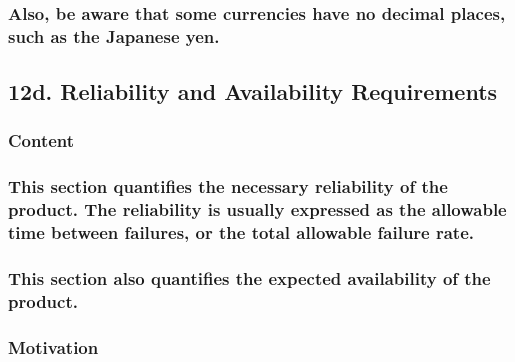 \documentclass[
]{article}
\begin{document}
\hypertarget{also-be-aware-that-some-currencies-have-no-decimal-places-such-as-the-japanese-yen.}{%
\subsubsection{\texorpdfstring{Also, be aware that some currencies have
no decimal places, such as the Japanese yen.
}{Also, be aware that some currencies have no decimal places, such as the Japanese yen. }}\label{also-be-aware-that-some-currencies-have-no-decimal-places-such-as-the-japanese-yen.}}

\hypertarget{d.-reliability-and-availability-requirements}{%
\subsection{12d. Reliability and Availability
Requirements}\label{d.-reliability-and-availability-requirements}}

\hypertarget{content-40}{%
\subsubsection{Content}\label{content-40}}

\hypertarget{this-section-quantifies-the-necessary-reliability-of-the-product.-the-reliability-is-usually-expressed-as-the-allowable-time-between-failures-or-the-total-allowable-failure-rate.}{%
\subsubsection{This section quantifies the necessary reliability of the
product. The reliability is usually expressed as the allowable time
between failures, or the total allowable failure
rate.}\label{this-section-quantifies-the-necessary-reliability-of-the-product.-the-reliability-is-usually-expressed-as-the-allowable-time-between-failures-or-the-total-allowable-failure-rate.}}

\hypertarget{this-section-also-quantifies-the-expected-availability-of-the-product.}{%
\subsubsection{\texorpdfstring{This section also quantifies the expected
availability of the product.
}{This section also quantifies the expected availability of the product. }}\label{this-section-also-quantifies-the-expected-availability-of-the-product.}}

\hypertarget{motivation-39}{%
\subsubsection{Motivation}\label{motivation-39}}
\end{document}
